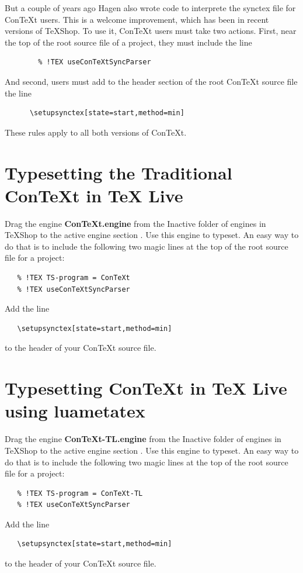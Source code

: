 \documentclass[11pt, oneside]{amsart}   	%
\begin{document}
But a couple of years ago Hagen also wrote code to interprete the synctex file for ConTeXt users. This is a welcome improvement, which has been in recent versions of TeXShop. To use it, ConTeXt users must take two actions. First, near the top of the root source file of a project, they must include the line
\begin{verbatim}
        % !TEX useConTeXtSyncParser
\end{verbatim}
And second, users must add to the header section of the root ConTeXt source file the line
\begin{verbatim}
      \setupsynctex[state=start,method=min] 
\end{verbatim} 
These rules apply to all both versions of ConTeXt.

\section{Typesetting the Traditional ConTeXt in TeX Live}

Drag the engine {\bf ConTeXt.engine} from the Inactive folder of engines in TeXShop to the active engine section
. Use this engine to typeset. An easy way to do that is to include the following two magic lines at the top of the root source file for a project:
\begin{verbatim}
   % !TEX TS-program = ConTeXt
   % !TEX useConTeXtSyncParser
\end{verbatim}
Add the line
\begin{verbatim}
   \setupsynctex[state=start,method=min]    
\end{verbatim}
to the header of your ConTeXt source file.

\section{Typesetting ConTeXt in TeX Live using luametatex}

Drag the engine {\bf ConTeXt-TL.engine} from the Inactive folder of engines in TeXShop to the active engine section
. Use this engine to typeset. An easy way to do that is to include the following two magic lines at the top of the root source file for a project:
\begin{verbatim}
   % !TEX TS-program = ConTeXt-TL
   % !TEX useConTeXtSyncParser
\end{verbatim}
Add the line
\begin{verbatim}
   \setupsynctex[state=start,method=min]    
\end{verbatim}
to the header of your ConTeXt source file.
\end{document}
